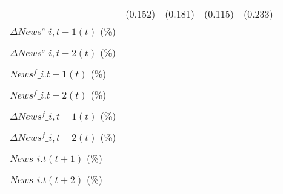 {\begin{tabular}{l*{4}{c}}
                    &     (0.152)         &     (0.181)         &     (0.115)         &     (0.233)         \\
\addlinespace
$ \Delta News^s\_{i,t-1}(t)$ (\%)&                     &                     &                     &                     \\
                    &                     &                     &                     &                     \\
\addlinespace
$ \Delta News^s\_{i,t-2}(t)$ (\%)&                     &                     &                     &                     \\
                    &                     &                     &                     &                     \\
\addlinespace
$ News^f\_{i.t-1}(t)$ (\%)&                     &                     &                     &                     \\
                    &                     &                     &                     &                     \\
\addlinespace
$ News^f\_{i.t-2}(t)$ (\%)&                     &                     &                     &                     \\
                    &                     &                     &                     &                     \\
\addlinespace
$ \Delta News^f\_{i,t-1}(t)$ (\%)&                     &                     &                     &                     \\
                    &                     &                     &                     &                     \\
\addlinespace
$ \Delta News^f\_{i,t-2}(t)$ (\%)&                     &                     &                     &                     \\
                    &                     &                     &                     &                     \\
\addlinespace
$ News\_{i.t}(t+1)$ (\%)&                     &                     &                     &                     \\
                    &                     &                     &                     &                     \\
\addlinespace
$ News\_{i.t}(t+2)$ (\%)&                     &                     &                     &                     \\

\end{tabular}}
